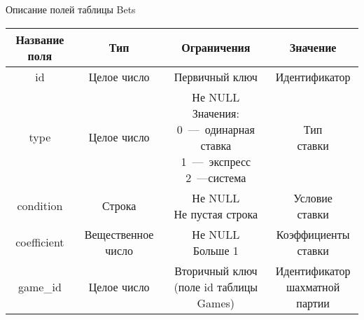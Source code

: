 \begin{center}
	\begin{threeparttable}
		\captionsetup{justification=raggedright,singlelinecheck=off}
		\caption{\label{bets_table}Описание полей таблицы Bets}
		\centering
		\begin{tabular}{|c|c|c|c|}
			\hline
			Название поля & Тип & Ограничения & Значение \\
			\hline
			id & Целое число & Первичный ключ & Идентификатор \\
			\hline
			type & Целое число & \specialcell{Не NULL\\Значения:\\0~---~одинарная ставка\\1~---~экспресс\\2~---система} & \specialcell{Тип\\ставки} \\
			\hline
			condition & Строка & \specialcell{Не NULL\\Не пустая строка} & \specialcell{Условие\\ставки}\\
			\hline
			coefficient & Вещественное число & \specialcell{Не NULL\\Больше 1} & \specialcell{Коэффициенты\\ставки}\\
			\hline
			game\_id & Целое число & \specialcell{Вторичный ключ\\(поле id таблицы Games)} & \specialcell{Идентификатор\\шахматной партии}\\
			\hline
		\end{tabular}
	\end{threeparttable}
\end{center}
